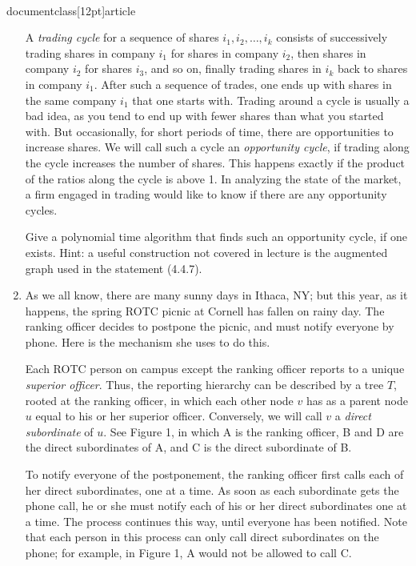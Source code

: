 \\documentclass[12pt]{article}
\begin{document}
\begin{enumerate}
A {\em trading cycle} for a sequence of shares $i_1,i_2,\ldots,i_k$ consists
of successively trading shares in company $i_1$
for shares in company $i_2$, then shares in company $i_2$ for
shares $i_3$, and so on,
finally trading shares in $i_k$ back to shares in company $i_1$. After
such a sequence of trades, one ends up with shares in the same company
$i_1$ that one starts with. Trading around a cycle is usually a bad idea,
as you tend to end up with fewer shares than what you started with.  But
occasionally, for short periods of time, there are opportunities to
increase shares.  We will call such a cycle an {\em opportunity cycle}, if
trading along the cycle increases the number of shares. This happens
exactly if the product of the ratios along the cycle is above 1. In analyzing
the state of the market, a firm engaged in trading would 
like to know if there are any opportunity cycles.

Give a polynomial time algorithm that finds such an opportunity
cycle, if one exists.
Hint: a useful construction not covered in lecture is the augmented graph
used in the statement (4.4.7).


\item

As we all know, there are many sunny days in Ithaca, NY;
but this year, as it happens, the spring ROTC picnic at Cornell
has fallen on rainy day.
The ranking officer decides to postpone the picnic, and must
notify everyone by phone.
Here is the mechanism she uses to do this.

Each ROTC person on campus except the ranking officer
reports to a unique {\em superior officer}.
Thus, the reporting hierarchy can be described by
a tree $T$, rooted at the ranking officer, in which
each other node $v$ has as a parent node $u$ equal
to his or her superior officer.
Conversely, we will call $v$ a {\em direct subordinate} of $u$.
See Figure 1, in which A is the ranking officer,
B and D are the direct subordinates of A,
and C is the direct subordinate of B.

To notify everyone of the postponement, the ranking officer
first calls each of her direct subordinates, one at a time.
As soon as each subordinate gets the phone call, he or she
must notify each of his or her direct subordinates one at a time.
The process continues this way, until everyone has been notified.
Note that each person in this process can only call
direct subordinates on the phone;
for example, in Figure 1, A would not be allowed to call C.


\end{enumerate}
\end{document}
